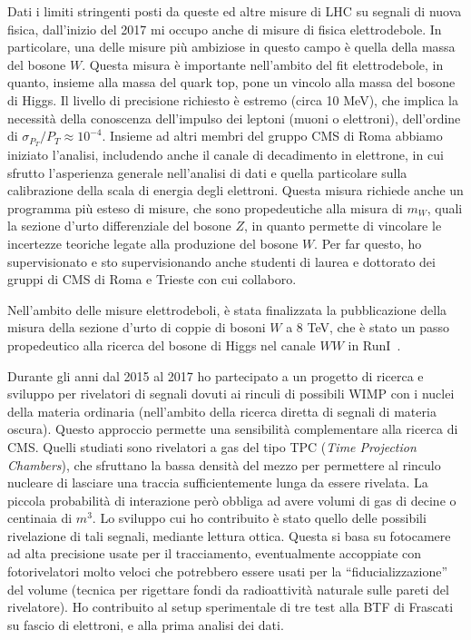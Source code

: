 \documentclass[a4paper,12pt,twoside]{article}
\begin{document}
{  
  Dati i limiti stringenti posti da queste ed altre misure di LHC su
  segnali di nuova fisica, dall'inizio del 2017 mi occupo anche di
  misure di fisica elettrodebole. In particolare, una delle misure
  pi\`u ambiziose in questo campo \`e quella della massa del bosone
  $W$. Questa misura \`e importante nell'ambito del fit elettrodebole,
  in quanto, insieme alla massa del quark top, pone un vincolo alla
  massa del bosone di Higgs. Il livello di precisione richiesto \`e
  estremo (circa 10 MeV), che implica la necessit\`a della conoscenza
  dell'impulso dei leptoni (muoni o elettroni), dell'ordine di
  $\sigma_{P_T}/P_T \approx 10^{-4}$. Insieme ad altri membri del
  gruppo CMS di Roma abbiamo iniziato l'analisi, includendo anche il
  canale di decadimento in elettrone, in cui sfrutto l'asperienza
  generale nell'analisi di dati e quella particolare sulla
  calibrazione della scala di energia degli elettroni.  Questa misura
  richiede anche un programma pi\`u esteso di misure, che sono
  propedeutiche alla misura di $m_W$, quali la sezione d'urto
  differenziale del bosone $Z$, in quanto permette di vincolare le
  incertezze teoriche legate alla produzione del bosone $W$. Per far
  questo, ho supervisionato e sto supervisionando anche studenti di
  laurea e dottorato dei gruppi di CMS di Roma e Trieste con cui
  collaboro.

  Nell'ambito delle misure elettrodeboli, \`e stata finalizzata la
  pubblicazione della misura della sezione d'urto di coppie di bosoni
  $W$ a 8 TeV, che \`e stato un passo propedeutico alla ricerca del
  bosone di Higgs nel canale $WW$ in RunI~.
  
  Durante gli anni dal 2015 al 2017 ho partecipato a un progetto di
  ricerca e sviluppo per rivelatori di segnali dovuti ai rinculi di
  possibili WIMP con i nuclei della materia ordinaria (nell'ambito
  della ricerca diretta di segnali di materia oscura). Questo
  approccio permette una sensibilit\`a complementare alla ricerca di
  CMS. Quelli studiati sono rivelatori a gas del tipo TPC ({\it Time
    Projection Chambers}), che sfruttano la bassa densit\`a del mezzo
  per permettere al rinculo nucleare di lasciare una traccia
  sufficientemente lunga da essere rivelata. La piccola probabilit\`a
  di interazione per\`o obbliga ad avere volumi di gas di decine o
  centinaia di $m^3$. Lo sviluppo cui ho contribuito \`e stato quello
  delle possibili rivelazione di tali segnali, mediante lettura
  ottica.  Questa si basa su fotocamere ad alta precisione usate per
  il tracciamento, eventualmente accoppiate con fotorivelatori molto
  veloci che potrebbero essere usati per la ``fiducializzazione'' del
  volume (tecnica per rigettare fondi da radioattivit\`a naturale
  sulle pareti del rivelatore). Ho contribuito al setup sperimentale
  di tre test alla BTF di Frascati su fascio di elettroni, e alla
  prima analisi dei dati.
  

}


\citeall{*}
\end{document}
